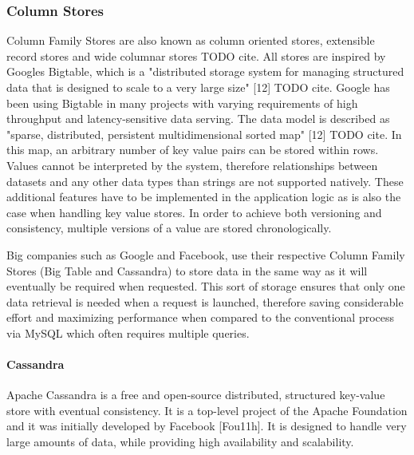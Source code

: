 \subsubsection{Column Stores}
Column Family Stores are also known as column oriented stores, extensible record stores and wide columnar stores TODO cite. All stores are inspired by Googles Bigtable, which is a "distributed storage system for managing structured data that is designed to scale to a very large size" [12] TODO cite. Google has been using Bigtable in many projects with varying requirements of high throughput and latency-sensitive data serving. The data model is described as "sparse, distributed, persistent multidimensional sorted map" [12] TODO cite. In this map, an arbitrary number of key value pairs can be stored within rows. Values cannot be interpreted by the system, therefore relationships between datasets and any other data types than strings are not supported natively. These additional features have to be implemented in the application logic as is also the case when handling key value stores. In order to achieve both versioning and consistency, multiple versions of a value are stored chronologically. 

Big companies such as Google and Facebook, use their respective Column Family Stores (Big Table and Cassandra) to store data in the same way as it will eventually be required when requested. This sort of storage  ensures that only one data retrieval is needed when a request is launched, therefore saving considerable effort and maximizing performance when compared to the conventional process via MySQL which often requires multiple queries.  

\paragraph{Cassandra}
Apache Cassandra is a free and open-source distributed, structured key-value store with eventual consistency. It is a top-level project of the Apache Foundation and it was initially developed by Facebook [Fou11h]. It is designed to handle very large amounts of data, while providing high availability and scalability.

